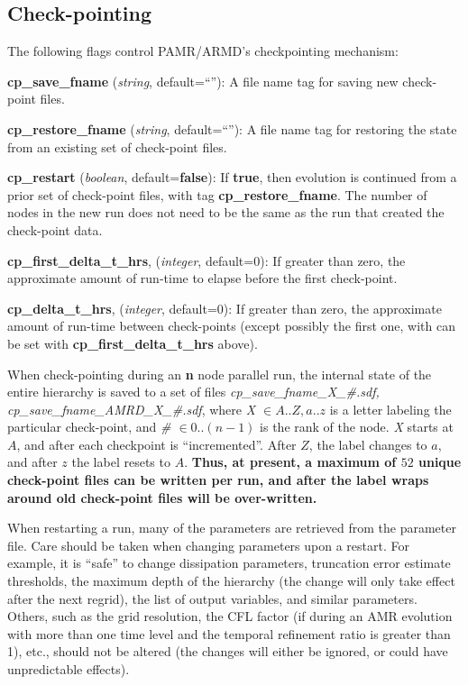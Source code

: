 \documentclass[aps,amssymb,unsortedaddress,nofootinbib]{revtex4}
\def\lsep{\itemsep 0.05in}
\begin{document}
\subsection{Check-pointing}\label{sec_cp}

The following flags control PAMR/ARMD's checkpointing mechanism:
\begin{list}{}{\lsep}
\item {\bf cp\_save\_fname} ({\em string}, default=``''): A file name tag for saving new check-point files.
\item {\bf cp\_restore\_fname} ({\em string}, default=``''): A file name tag for restoring the state from an existing
      set of check-point files.
\item {\bf cp\_restart} ({\em boolean}, default={\bf false}): If {\bf true}, then 
      evolution is continued from a prior set of check-point files, with tag {\bf cp\_restore\_fname}.
      The number of nodes in the new run does not need to be the same as the run that created the check-point data.
\item {\bf cp\_first\_delta\_t\_hrs}, ({\em integer}, default=0): If greater than zero, the approximate
      amount of run-time to elapse before the first check-point.
\item {\bf cp\_delta\_t\_hrs}, ({\em integer}, default=0): If greater than zero, the approximate
      amount of run-time between check-points (except possibly the first one, with can be set 
      with {\bf cp\_first\_delta\_t\_hrs} above).
\end{list}
When check-pointing
during an {\bf n} node parallel run, the internal state of the entire hierarchy
is saved to a set of files {\it cp\_save\_fname\_X\_\#.sdf, cp\_save\_fname\_AMRD\_X\_\#.sdf},
where {\it X $\in A..Z,a..z$} is a letter labeling the particular check-point, and
{\it \# $\in0..(n-1)$} is the rank of the node. {\it X} starts at $A$, and
after each checkpoint is ``incremented''. After $Z$, the label changes to $a$, and after $z$
the label resets to $A$. {\bf Thus, at present, a maximum of $52$ unique check-point files can
be written per run, and after the label wraps around old check-point files will be
over-written.}

When restarting a run, many of the parameters are retrieved from the parameter file.
Care should be taken when changing parameters upon a restart. For example, it is
``safe'' to change dissipation parameters, truncation error estimate thresholds,
the maximum depth of the hierarchy (the change will only take effect after
the next regrid), the list of output variables, and similar parameters. Others,
such as the grid resolution, the CFL factor (if during an AMR evolution with
more than one time level and the temporal refinement ratio is greater than 1),
etc., should not be altered (the changes will either be
ignored, or could have unpredictable effects). 
\end{document}
